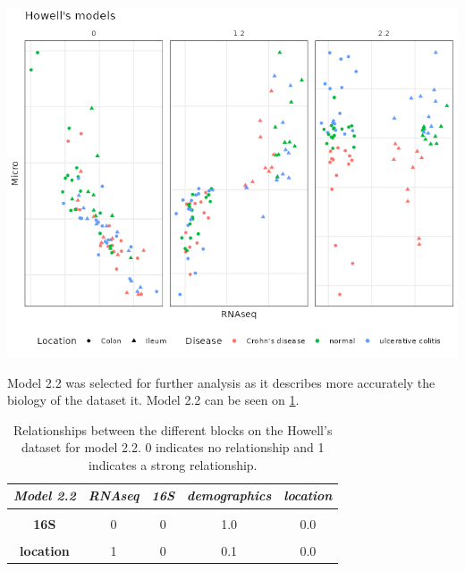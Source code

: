 \documentclass[
  12pt,
  a4paper,
  twoside,
  openright]{book}
\let\origfigure\figure
\let\endorigfigure\endfigure
\renewenvironment{figure}[1][2] {
    \expandafter\origfigure\expandafter[!htp]
} {
    \endorigfigure
}
\begin{document}
\begin{figure}
\includegraphics[width=1\linewidth]{images/howell-models} \caption[Models from inteRmodel on the Howell's datset.]{Models from inteRmodel on the Howell's datset. The three main models, model 0, 1.2 and 2.2 on the Howell's dataset colored by section colon, ileum and shape according to the disease: square, ulcerative colitis; triangle, normal; circle, Crohn's disease. Model 0 has just trancriptomic and microbiome data, model 1.2 has transcriptomic, microbiome and sample data and model 2.2 has transcriptomic, microbiome and sample data split in different blocks.}\label{fig:howell-models}
\end{figure}

Model 2.2 was selected for further analysis as it describes more accurately the biology of the dataset it.
Model 2.2 can be seen on \ref{tab:howell-model2-2}.

\begin{table}[H]

\caption[Models 2.2 the of Howell's dataset.]{\label{tab:howell-model2-2}Relationships between the different blocks on the Howell's dataset for model 2.2. 0 indicates no relationship and 1 indicates a strong relationship.}
\centering
\begin{tabular}[t]{|>{}c|c|c|c|>{}c|}
\hline
\em{\textbf{Model 2.2}} & \em{\textbf{RNAseq}} & \em{\textbf{16S}} & \em{\textbf{demographics}} & \em{\textbf{location}}\\
\hline
\textbf{\cellcolor{gray!6}{RNAseq}} & \cellcolor{gray!6}{0} & \cellcolor{gray!6}{0} & \cellcolor{gray!6}{0.0} & \cellcolor{gray!6}{1.0}\\
\hline
\textbf{16S} & 0 & 0 & 1.0 & 0.0\\
\hline
\textbf{\cellcolor{gray!6}{demographics}} & \cellcolor{gray!6}{0} & \cellcolor{gray!6}{1} & \cellcolor{gray!6}{0.0} & \cellcolor{gray!6}{0.1}\\
\hline
\textbf{location} & 1 & 0 & 0.1 & 0.0\\
\hline
\end{tabular}
\end{table}
\end{document}
